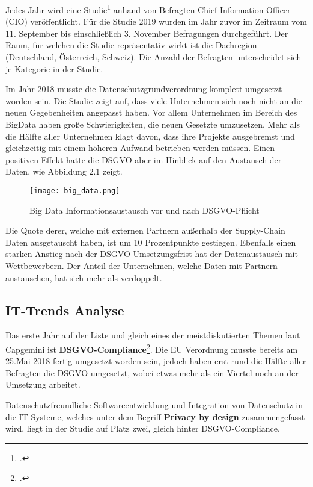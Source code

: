 Jedes Jahr wird eine Studie\footcite{Capgemini-Studie} anhand von Befragten Chief Information Officer (CIO) veröffentlicht.
Für die Studie 2019 wurden im Jahr zuvor im Zeitraum vom 11. September bis einschließlich 3. November Befragungen durchgeführt.
Der Raum, für welchen die Studie repräsentativ wirkt ist die Dachregion (Deutschland, Österreich, Schweiz).
Die Anzahl der Befragten unterscheidet sich je Kategorie in der Studie.

Im Jahr 2018 musste die Datenschutzgrundverordnung komplett umgesetzt worden sein. Die Studie zeigt auf, dass viele Unternehmen sich noch nicht an die neuen Gegebenheiten angepasst haben.
Vor allem Unternehmen im Bereich des BigData haben große Schwierigkeiten, die neuen Gesetzte umzusetzen.
Mehr als die Hälfte aller Unternehmen klagt davon, dass ihre Projekte ausgebremst und gleichzeitig mit einem höheren Aufwand betrieben werden müssen.
Einen positiven Effekt hatte die DSGVO aber im Hinblick auf den Austausch der Daten, wie Abbildung 2.1 zeigt.
\begin{center}
\begin{figure}[h]
    \centering
    \texttt{[image: big\_data.png]}
    \caption{Big Data Informationsaustausch vor und nach DSGVO-Pflicht}
\end{figure}
\end{center}
Die Quote derer, welche mit externen Partnern außerhalb der Supply-Chain Daten ausgetauscht haben, ist um 10 Prozentpunkte gestiegen.
Ebenfalls einen starken Anstieg nach der DSGVO Umsetzungsfrist hat der Datenaustausch mit Wettbewerbern.
Der Anteil der Unternehmen, welche Daten mit Partnern austauschen, hat sich mehr als verdoppelt.
\subsection{IT-Trends Analyse}
Das erste Jahr auf der Liste und gleich eines der meistdiskutierten Themen laut Capgemini ist \textbf{DSGVO-Compliance}\footcite{Capgemini-Studie}.
Die EU Verordnung musste bereits am 25.Mai 2018 fertig umgesetzt worden sein, jedoch haben erst rund die Hälfte aller Befragten die DSGVO umgesetzt, wobei etwas mehr als ein Viertel noch an der Umsetzung arbeitet.

Datenschutzfreundliche Softwareentwicklung und Integration von Datenschutz in die IT-Systeme, welches unter dem Begriff \textbf{Privacy by design} zusammengefasst wird, liegt in der Studie auf Platz zwei, gleich hinter DSGVO-Compliance. 

